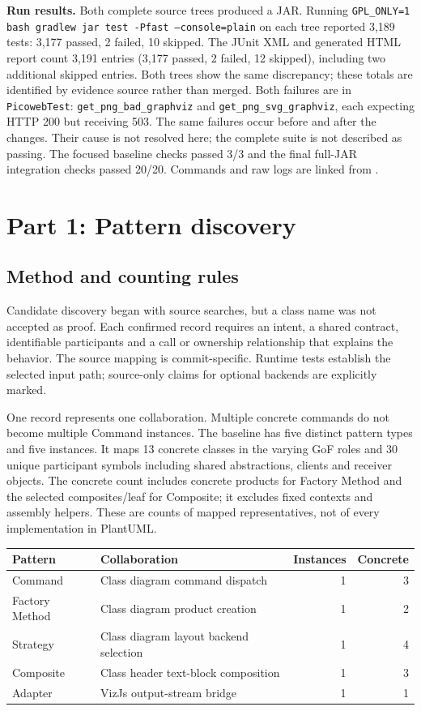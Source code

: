 \documentclass[11pt,a4paper]{article}
\begin{document}
\textbf{Run results.} Both complete source trees produced a JAR. Running
\texttt{GPL\_ONLY=1 bash gradlew jar test -Pfast --console=plain} on each tree
reported 3,189 tests: 3,177 passed, 2 failed, 10 skipped. The JUnit XML and
generated HTML report count 3,191 entries (3,177 passed, 2 failed, 12 skipped),
including two additional skipped entries. Both trees show the same discrepancy;
these totals are identified by evidence source rather than merged. Both failures are in
\texttt{PicowebTest}: \texttt{get\_png\_bad\_graphviz} and
\texttt{get\_png\_svg\_graphviz}, each expecting HTTP 200 but receiving 503.
The same failures occur before and after the changes. Their cause is not resolved
here; the complete suite is not described as passing. The focused baseline checks
passed 3/3 and the final full-JAR integration checks passed 20/20. Commands and raw
logs are linked from .

\section{Part 1: Pattern discovery}
\subsection{Method and counting rules}
Candidate discovery began with source searches, but a class name was not accepted
as proof. Each confirmed record requires an intent, a shared contract, identifiable
participants and a call or ownership relationship that explains the behavior.
The source mapping is commit-specific. Runtime tests establish the selected input
path; source-only claims for optional backends are explicitly marked.

One record represents one collaboration. Multiple concrete commands do not become
multiple Command instances. The baseline has five distinct pattern types and five
instances. It maps 13 concrete classes in the varying GoF roles and 30 unique
participant symbols including shared abstractions, clients and receiver objects.
The concrete count includes concrete products for Factory Method and the selected
composites/leaf for Composite; it excludes fixed contexts and assembly helpers.
These are counts of mapped representatives, not of every implementation in PlantUML.

\begin{tabularx}{\linewidth}{@{}lXrr@{}}\toprule
Pattern & Collaboration & Instances & Concrete\\\midrule
Command & Class diagram command dispatch & 1 & 3\\
Factory Method & Class diagram product creation & 1 & 2\\
Strategy & Class diagram layout backend selection & 1 & 4\\
Composite & Class header text-block composition & 1 & 3\\
Adapter & VizJs output-stream bridge & 1 & 1\\\bottomrule
\end{tabularx}
\end{document}
